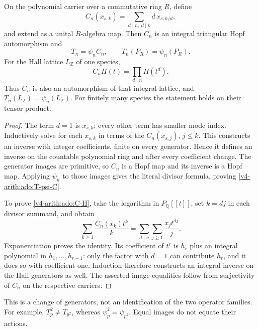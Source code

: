\begin{proposition}
\label{v4-arith:ado:triangular-factorization}
On the polynomial carrier over a commutative ring \(R\), define
\[
 C_n(x_{s,k})=\sum_{d\mid n,\ d\mid k}d\,x_{s,k/d},
\]
and extend as a unital \(R\)-algebra map. Then \(C_n\) is an integral
triangular Hopf automorphism and
\begin{equation}
\label{v4-arith:ado:T-psi-C}
 T_n=\psi_n C_n,\qquad T_n(P_R)=\psi_n(P_R).
\end{equation}
For the Hall lattice \(L_{\mathbb Z}\) of one species,
\begin{equation}
\label{v4-arith:ado:C-H}
 C_nH(t)=\prod_{d\mid n}H(t^d).
\end{equation}
Thus \(C_n\) is also an automorphism of that integral lattice, and
\(T_n(L_{\mathbb Z})=\psi_n(L_{\mathbb Z})\).
For finitely many species the statement holds on their tensor product.
\end{proposition}
\begin{proof}
The term \(d=1\) is \(x_{s,k}\); every other term has smaller mode
index. Inductively solve for each \(x_{s,k}\) in terms of the
\(C_n(x_{s,j})\), \(j\le k\). This constructs an inverse with integer
coefficients, finite on every generator. Hence it defines an inverse
on the countable polynomial ring and after every coefficient change.
The generator images are primitive, so \(C_n\) is a Hopf map and its
inverse is a Hopf map. Applying \(\psi_n\) to those images gives the
literal divisor formula, proving \eqref{v4-arith:ado:T-psi-C}.

To prove \eqref{v4-arith:ado:C-H}, take the logarithm in
\(P_{\mathbb Q}[[t]]\), set \(k=dj\) in each divisor summand, and obtain
\[
 \sum_{k\ge1}\frac{C_n(x_k)t^k}{k}
 =\sum_{d\mid n}\sum_{j\ge1}\frac{x_jt^{dj}}j.
\]
Exponentiation proves the identity. Its coefficient of \(t^r\) is
\(h_r\) plus an integral polynomial in \(h_1,\ldots,h_{r-1}\):
only the factor with \(d=1\) can contribute \(h_r\), and it does so
with coefficient one. Induction therefore constructs an integral inverse
on the Hall generators as well. The asserted image equalities follow
from surjectivity of \(C_n\) on the respective carriers.
\end{proof}

This is a change of generators, not an identification of the two
operator families. For example, \(T_p^2\ne T_{p^2}\), whereas
\(\psi_p^2=\psi_{p^2}\). Equal images do not equate their actions.

